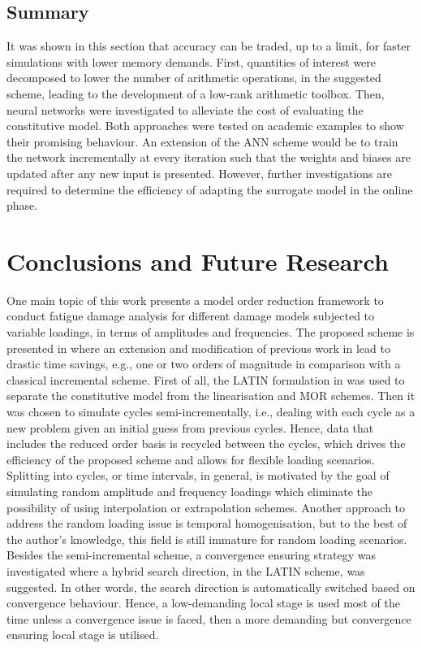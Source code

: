 \section{Summary}
It was shown in this section that accuracy can be traded, up to a limit, for faster simulations with lower memory demands. First, quantities of interest were decomposed to lower the number of arithmetic operations, in the suggested scheme, leading to the development of a low-rank arithmetic toolbox. Then, neural networks were investigated to alleviate the cost of evaluating the constitutive model. Both approaches were tested on academic examples to show their promising behaviour. An extension of the ANN scheme would be to train the network incrementally at every iteration such that the weights and biases are updated after any new input is presented. However, further investigations are required to determine the efficiency of adapting the surrogate model in the online phase.


\chapter{Conclusions and Future Research}
\label{summary_outlook}


One main topic of this work presents a model order reduction framework to conduct fatigue damage analysis for different damage models subjected to variable loadings, in terms of amplitudes and frequencies. The proposed scheme is presented in  where an extension and modification of previous work in \parencite{bhattacharyya2018model} lead to drastic time savings, e.g., one or two orders of magnitude in comparison with a classical incremental scheme. First of all, the LATIN formulation in \parencite{bhattacharyya2019kinetic,allix1989damage} was used to separate the constitutive model from the linearisation and MOR schemes. Then it was chosen to simulate cycles semi-incrementally, i.e., dealing with each cycle as a new problem given an initial guess from previous cycles. Hence, data that includes the reduced order basis is recycled between the cycles, which drives the efficiency of the proposed scheme and allows for flexible loading scenarios. Splitting into cycles, or time intervals, in general, is motivated by the goal of simulating random amplitude and frequency loadings which eliminate the possibility of using interpolation or extrapolation schemes. Another approach to address the random loading issue is temporal homogenisation, but to the best of the author's knowledge, this field is still immature for random loading scenarios. Besides the semi-incremental scheme, a convergence ensuring strategy was investigated where a hybrid search direction, in the LATIN scheme, was suggested. In other words, the search direction is automatically switched based on convergence behaviour. Hence, a low-demanding local stage is used most of the time unless a convergence issue is faced, then a more demanding but convergence ensuring local stage is utilised.

